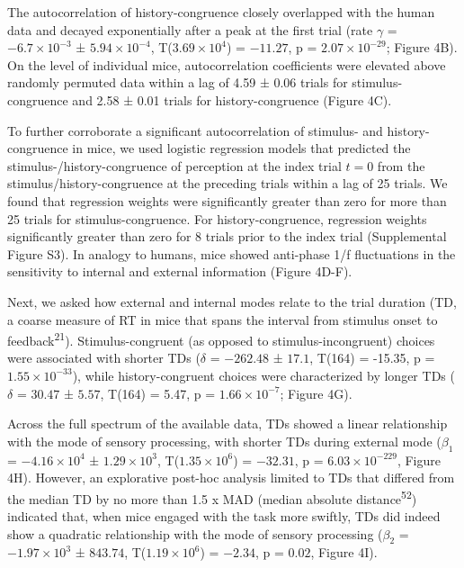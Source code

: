 \documentclass[
]{article}
\begin{document}
The autocorrelation of history-congruence closely overlapped with the
human data and decayed exponentially after a peak at the first trial
(rate \(\gamma\) = \(\ensuremath{-6.7\times 10^{-3}}\) ±
\(\ensuremath{5.94\times 10^{-4}}\),
T(\(\ensuremath{3.69\times 10^{4}}\)) = \(-11.27\), p =
\(\ensuremath{2.07\times 10^{-29}}\); Figure 4B). On the level of
individual mice, autocorrelation coefficients were elevated above
randomly permuted data within a lag of 4.59 ± 0.06 trials for
stimulus-congruence and 2.58 ± 0.01 trials for history-congruence
(Figure 4C).

To further corroborate a significant autocorrelation of stimulus- and
history-congruence in mice, we used logistic regression models that
predicted the stimulus-/history-congruence of perception at the index
trial \(t = 0\) from the stimulus/history-congruence at the preceding
trials within a lag of 25 trials. We found that regression weights were
significantly greater than zero for more than 25 trials for
stimulus-congruence. For history-congruence, regression weights
significantly greater than zero for 8 trials prior to the index trial
(Supplemental Figure S3). In analogy to humans, mice showed anti-phase
1/f fluctuations in the sensitivity to internal and external information
(Figure 4D-F).

Next, we asked how external and internal modes relate to the trial
duration (TD, a coarse measure of RT in mice that spans the interval
from stimulus onset to feedback\textsuperscript{21}). Stimulus-congruent
(as opposed to stimulus-incongruent) choices were associated with
shorter TDs (\(\delta\) = \(-262.48\) ± \(17.1\), T(164) = -15.35, p =
\(\ensuremath{1.55\times 10^{-33}}\)), while history-congruent choices
were characterized by longer TDs (\(\delta\) = \(30.47\) ± \(5.57\),
T(164) = 5.47, p = \(\ensuremath{1.66\times 10^{-7}}\); Figure 4G).

Across the full spectrum of the available data, TDs showed a linear
relationship with the mode of sensory processing, with shorter TDs
during external mode (\(\beta_1\) = \(\ensuremath{-4.16\times 10^{4}}\)
± \(\ensuremath{1.29\times 10^{3}}\),
T(\(\ensuremath{1.35\times 10^{6}}\)) = \(-32.31\), p =
\(\ensuremath{6.03\times 10^{-229}}\), Figure 4H). However, an
explorative post-hoc analysis limited to TDs that differed from the
median TD by no more than 1.5 x MAD (median absolute
distance\textsuperscript{52}) indicated that, when mice engaged with the
task more swiftly, TDs did indeed show a quadratic relationship with the
mode of sensory processing (\(\beta_2\) =
\(\ensuremath{-1.97\times 10^{3}}\) ± \(843.74\),
T(\(\ensuremath{1.19\times 10^{6}}\)) = \(-2.34\), p = \(0.02\), Figure
4I).
\end{document}
